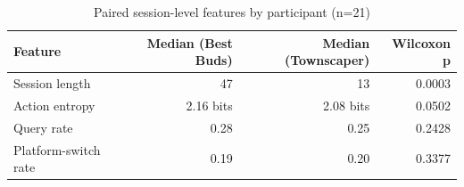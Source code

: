 \begin{table}[t]
\centering
\caption{Paired session-level features by participant (n=21)}
\label{tab:rq3-session-features}
\begin{tabular}{lrrr}
\toprule
Feature & Median (Best Buds) & Median (Townscaper) & Wilcoxon p \\
\midrule
Session length & 47 & 13 & 0.0003 \\
Action entropy & 2.16 bits & 2.08 bits & 0.0502 \\
Query rate & 0.28 & 0.25 & 0.2428 \\
Platform-switch rate & 0.19 & 0.20 & 0.3377 \\
\bottomrule
\end{tabular}
\end{table}
